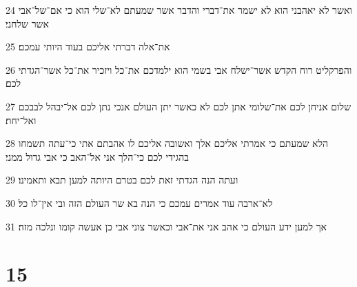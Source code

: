 \par 24 ואשר לא יאהבני הוא לא ישמר את־דברי והדבר אשר שמעתם לא־שלי הוא כי אם־של־אבי אשר שלחני׃
\par 25 את־אלה דברתי אליכם בעוד היותי עמכם׃
\par 26 והפרקליט רוח הקדש אשר־ישלח אבי בשמי הוא ילמדכם את־כל ויזכיר את־כל אשר־הגדתי לכם׃
\par 27 שלום אניחן לכם את־שלומי אתן לכם לא כאשר יתן העולם אנכי נתן לכם אל־יבהל לבבכם ואל־יחת׃
\par 28 הלא שמעתם כי אמרתי אליכם אלך ואשובה אליכם לו אהבתם אתי כי־עתה תשמחו בהגידי לכם כי־הלך אני אל־האב כי אבי גדול ממני׃
\par 29 ועתה הנה הגדתי זאת לכם בטרם היותה למען תבא ותאמינו׃
\par 30 לא־ארבה עוד אמרים עמכם כי הנה בא שר העולם הזה ובי אין־לו כל׃
\par 31 אך למען ידע העולם כי אהב אני את־אבי וכאשר צוני אבי כן אעשה קומו ונלכה מזה׃

\chapter{15}

